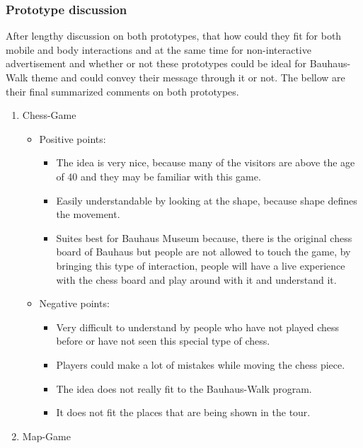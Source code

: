 \subsubsection{Prototype discussion}
After lengthy discussion on both prototypes, that how could they fit for both mobile and body interactions and at the same time for non-interactive advertisement and whether or not these prototypes could be ideal for Bauhaus-Walk theme and could convey their message through it or not. The bellow are their final summarized comments on both prototypes. 

\begin {enumerate}

\item Chess-Game

\begin {itemize}

\item{Positive points:} 

\begin {itemize}
\item	The idea is very nice, because many of the visitors are above the age of 40 and they may be familiar with this game.
\item	Easily understandable by looking at the shape, because shape defines the movement. 
\item	Suites best for Bauhaus Museum because, there is the original chess board of Bauhaus but people are not allowed to touch the game, by bringing this type of interaction, people will have a live experience with the chess board and play around with it and understand it.

\end {itemize}

\item{Negative points:} \
\begin {itemize}
\item	Very difficult to understand by people who have not played chess before or have not seen this special type of chess.
\item	Players could make a lot of mistakes while moving the chess piece. 
\item	The idea does not really fit to the Bauhaus-Walk program.
\item	It does not fit the places that are being shown in the tour.
\end {itemize}
\end {itemize}

\item Map-Game 


\end{enumerate}
